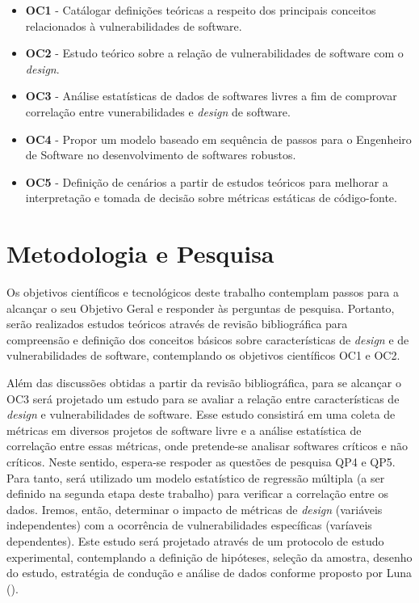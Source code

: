 	 	\begin{itemize}
			\item \textbf{OC1} - Catálogar definições teóricas a respeito dos principais conceitos relacionados à vulnerabilidades de software.
			\item \textbf{OC2} - Estudo teórico sobre a relação de vulnerabilidades de software com o \emph{design}.
			\item \textbf{OC3} - Análise estatísticas de dados de softwares livres a fim de comprovar correlação entre vunerabilidades e \emph{design} de software.
			\item \textbf{OC4} - Propor um modelo baseado em sequência de passos para o Engenheiro de Software no desenvolvimento de softwares robustos.
			\item \textbf{OC5} - Definição de cenários a partir de estudos teóricos para melhorar a interpretação e tomada de decisão sobre métricas estáticas de código-fonte.
	 	\end{itemize}


\section{Metodologia e Pesquisa}

Os objetivos científicos e tecnológicos deste trabalho contemplam passos para a alcançar o seu Objetivo Geral e responder às perguntas de pesquisa. Portanto, serão realizados estudos teóricos através de revisão bibliográfica para compreensão e definição dos conceitos básicos sobre características de \emph{design}  e de vulnerabilidades de software, contemplando os objetivos científicos OC1 e OC2.

Além das discussões obtidas a partir da revisão bibliográfica, para se alcançar o OC3 será projetado um estudo para se avaliar a relação entre características de \emph{design} e vulnerabilidades de software.
%
Esse estudo consistirá em uma coleta de métricas em diversos projetos de software livre e a análise estatística de correlação entre essas métricas, onde pretende-se analisar softwares críticos e não críticos.
%
Neste sentido, espera-se respoder as questões de pesquisa QP4 e QP5. Para tanto, será utilizado um modelo estatístico de regressão múltipla (a ser definido na segunda etapa deste trabalho) para verificar a correlação entre os dados.
%
Iremos, então, determinar o impacto de métricas de \emph{design} (variáveis independentes) com a ocorrência de  vulnerabilidades específicas (varíaveis dependentes).
%
Este estudo será projetado através de um protocolo de estudo experimental, contemplando a definição de hipóteses, seleção da amostra, desenho do estudo, estratégia de condução e análise de dados conforme proposto por Luna (\citeyear{luna1998}).

